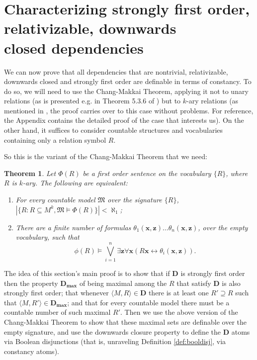 \documentclass{article}
\newtheorem{Theorem}{Theorem}[section]
\theoremstyle{definition}
\newcommand{\tuple}{\mathbf}
\newcommand{\M}{\mathfrak M}
\newcommand{\D}{\mathbf D}
\newcommand{\Dmax}{\mathbf D_{\textbf{max}}}
\begin{document}
\section{Characterizing strongly first order, relativizable, downwards\\ closed dependencies}
We can now prove that all dependencies that are nontrivial, relativizable, downwards closed and strongly first order are definable in terms of constancy. To do so, we will need to use the Chang-Makkai Theorem, applying it not to unary relations (as is presented e.g. in Theorem 5.3.6 of \cite{chang1990model}) but to $k$-ary relations (as mentioned in \cite{chang1964some}, the proof carries over to this case without problems. For reference, the Appendix contains the detailed proof of the case that interests us). On the other hand, it suffices to consider countable structures and vocabularies containing only a relation symbol $R$. 

So this is the variant of the Chang-Makkai Theorem that we need: 
\begin{Theorem}
	Let $\Phi(R)$ be a first order sentence on the vocabulary $\{R\}$, where $R$ is $k$-ary. The following are equivalent: 
	\begin{enumerate}
		\item For every countable model $\M$ over the signature $\{R\}$, $|\{R : R \subseteq M^k, \M \models \Phi(R)\}| < \aleph_1$; 
		\item There are a finite number of formulas $\theta_1(\tuple x, \tuple z) \ldots \theta_n(\tuple x, \tuple z)$, over the empty vocabulary, such that 
			\[
				\phi(R) \models \bigvee_{i=1}^n \exists \tuple z \forall \tuple x (R \tuple x \leftrightarrow \theta_i(\tuple x, \tuple z)).
			\]
	\end{enumerate}
	\label{thm:changmakkai}
\end{Theorem}
The idea of this section's main proof is to show that if $\D$ is strongly first order then the property $\Dmax$ of being maximal among the $R$ that satisfy $\D$ is also strongly first order; that whenever $\langle M, R\rangle \in \D$ there is at least one $R' \supseteq R$ such that $\langle M, R'\rangle \in \Dmax$; and that for every countable model there must be a countable number of such maximal $R'$. Then we use the above version of the Chang-Makkai Theorem to show that these maximal sets are definable over the empty signature, and use the downwards closure property to define the $\D$ atoms via Boolean disjunctions (that is, unraveling Definition \ref{def:booldisj}, via constancy atoms). 
\end{document}
